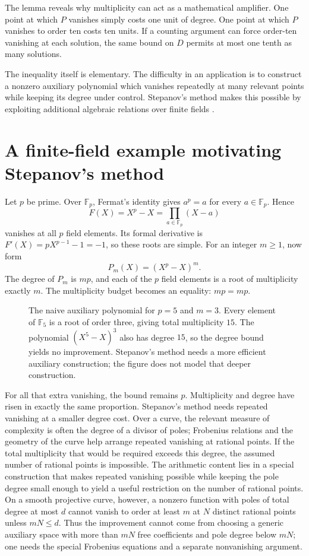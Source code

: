 \documentclass[11pt,openany,oneside]{scrbook}
\theoremstyle{definition}
\theoremstyle{remark}
\newcommand{\F}{\mathbb F}
\begin{document}
The lemma reveals why multiplicity can act as a mathematical amplifier. One point at which $P$ vanishes simply costs one unit of degree. One point at which $P$ vanishes to order ten costs ten units. If a counting argument can force order-ten vanishing at each solution, the same bound on $D$ permits at most one tenth as many solutions.

The inequality itself is elementary. The difficulty in an application is to construct a nonzero auxiliary polynomial which vanishes repeatedly at many relevant points while keeping its degree under control. Stepanov's method makes this possible by exploiting additional algebraic relations over finite fields \parencite{Stepanov1969,Bombieri1974}.

\section{A finite-field example motivating Stepanov's method}
Let $p$ be prime. Over $\F_p$, Fermat's identity gives $a^p=a$ for every $a\in\F_p$. Hence
\[
F(X)=X^p-X=\prod_{a\in\F_p}(X-a)
\]
vanishes at all $p$ field elements. Its formal derivative is $F'(X)=pX^{p-1}-1=-1$, so these roots are simple. For an integer $m\ge1$, now form
\[
P_m(X)=(X^p-X)^m.
\]
The degree of $P_m$ is $mp$, and each of the $p$ field elements is a root of multiplicity exactly $m$. The multiplicity budget becomes an equality: $mp=mp$.

\begin{figure}[ht]
\centering

\caption{The naive auxiliary polynomial for $p=5$ and $m=3$. Every element of $\F_5$ is a root of order three, giving total multiplicity $15$. The polynomial $(X^5-X)^3$ also has degree $15$, so the degree bound yields no improvement. Stepanov's method needs a more efficient auxiliary construction; the figure does not model that deeper construction.}
\label{fig:stepanov-budget}
\end{figure}

For all that extra vanishing, the bound remains $p$. Multiplicity and degree have risen in exactly the same proportion. Stepanov's method needs repeated vanishing at a smaller degree cost. Over a curve, the relevant measure of complexity is often the degree of a divisor of poles; Frobenius relations and the geometry of the curve help arrange repeated vanishing at rational points. If the total multiplicity that would be required exceeds this degree, the assumed number of rational points is impossible. The arithmetic content lies in a special construction that makes repeated vanishing possible while keeping the pole degree small enough to yield a useful restriction on the number of rational points.  On a smooth projective curve, however, a nonzero function with poles of total degree at most $d$ cannot vanish to order at least $m$ at $N$ distinct rational points unless $mN\le d$.  Thus the improvement cannot come from choosing a generic auxiliary space with more than $mN$ free coefficients and pole degree below $mN$; one needs the special Frobenius equations and a separate nonvanishing argument.
\end{document}
